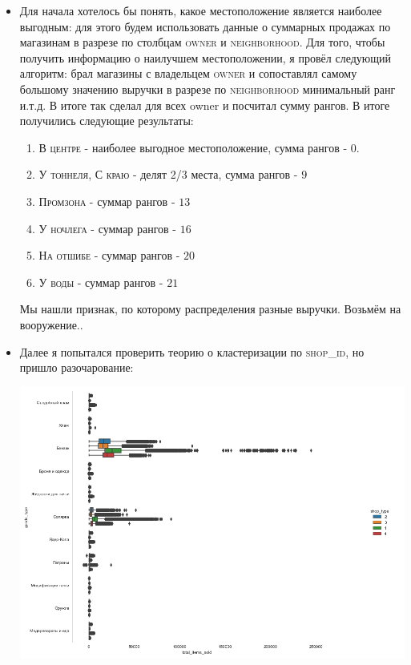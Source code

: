 \documentclass[%
10pt, %
final, %
oneside, %
onecolumn, %
centertags]{article} %
\theoremstyle{plain}
\theoremstyle{definition}
\theoremstyle{remark}
\begin{document}
\begin{itemize}
	\item Для начала хотелось бы понять, какое местоположение является наиболее выгодным: для этого будем использовать данные о суммарных продажах по магазинам в разрезе по столбцам \textsc{owner} и \textsc{neighborhood}. Для того, чтобы получить информацию о наилучшем местоположении, я провёл следующий алгоритм: брал магазины с владельцем \textsc{owner} и сопоставлял самому большому значению выручки в разрезе по \textsc{neighborhood} минимальный ранг и.т.д. В итоге так сделал для всех owner и посчитал сумму рангов. В итоге получились следующие результаты:
	\begin{enumerate}
		\item \textsc{В центре} - наиболее выгодное местоположение, сумма рангов - $0$.
		\item \textsc{У тоннеля, С краю} - делят 2/3 места, сумма рангов - $9$
		\item \textsc{Промзона} - суммар рангов - $13$
		\item \textsc{У ночлега} - суммар рангов - $16$
		\item \textsc{На отшибе} - суммар рангов - $20$
		\item \textsc{У воды} - суммар рангов - $21$
	\end{enumerate}

	Мы нашли признак, по которому распределения разные выручки. Возьмём на вооружение..
	\item Далее я попытался проверить теорию о кластеризации по \textsc{shop\_id}, но пришло разочарование:
	\begin{center}
	\includegraphics[scale=0.4]{13.png}


\end{center}
\end{itemize}
\end{document}
